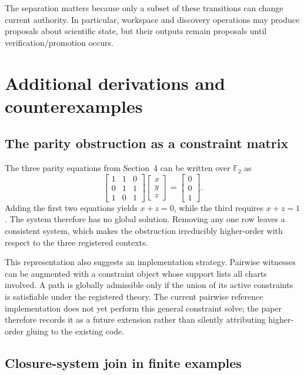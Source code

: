 The separation matters because only a subset of these transitions can change current authority. In particular, workspace and discovery operations may produce proposals about scientific state, but their outputs remain proposals until verification/promotion occurs.

\section{Additional derivations and counterexamples}

\subsection{The parity obstruction as a constraint matrix}

The three parity equations from Section~4 can be written over \(\mathbb F_2\) as
\[
\begin{bmatrix}
1&1&0\\
0&1&1\\
1&0&1
\end{bmatrix}
\begin{bmatrix}x\\y\\z\end{bmatrix}
=
\begin{bmatrix}0\\0\\1\end{bmatrix}.
\]
Adding the first two equations yields \(x+z=0\), while the third requires \(x+z=1\). The system therefore has no global solution. Removing any one row leaves a consistent system, which makes the obstruction irreducibly higher-order with respect to the three registered contexts.

This representation also suggests an implementation strategy. Pairwise witnesses can be augmented with a constraint object whose support lists all charts involved. A path is globally admissible only if the union of its active constraints is satisfiable under the registered theory. The current pairwise reference implementation does not yet perform this general constraint solve; the paper therefore records it as a future extension rather than silently attributing higher-order gluing to the existing code.

\subsection{Closure-system join in finite examples}

